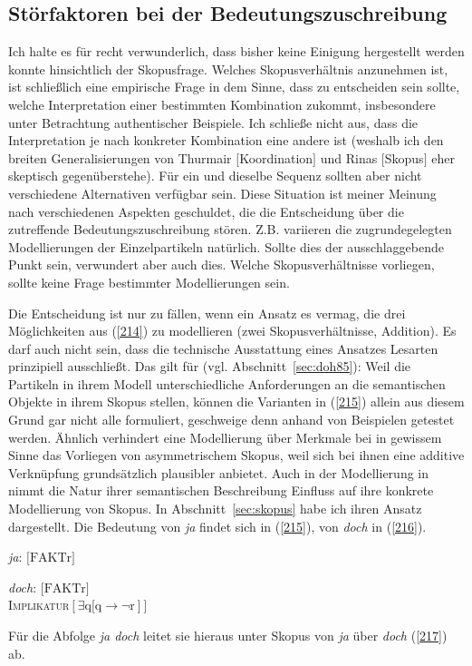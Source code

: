 \subsection{Störfaktoren bei der Bedeutungszuschreibung}
Ich halte es für recht verwunderlich, dass bisher keine Einigung hergestellt werden konnte hinsichtlich der Skopusfrage. Welches Skopusverhältnis anzunehmen ist, ist schließlich eine empirische Frage in dem Sinne, dass zu entscheiden sein sollte, welche Interpretation einer bestimmten Kombination zukommt, insbesondere unter Betrachtung authentischer Beispiele. Ich schließe nicht aus, dass die Interpretation je nach konkreter Kombination eine andere ist (weshalb ich den breiten Generalisierungen von Thurmair $[$Koordination$]$ und Rinas $[$Skopus$]$ eher skeptisch gegenüberstehe). Für ein und dieselbe Sequenz sollten aber nicht verschiedene Alternativen verfügbar sein. Diese Situation ist meiner Meinung nach verschiedenen Aspekten geschuldet, die die Entscheidung über die zu\-treffende Bedeutungszuschreibung stören. Z.B. variieren die zugrundegelegten Mo\-dellierungen der Einzelpartikeln natürlich. Sollte dies der ausschlaggebende Punkt sein, verwundert aber auch dies. Welche Skopusverhältnisse vorliegen, sollte keine Frage bestimmter Modellierungen sein. 

Die Entscheidung ist nur zu fällen, wenn ein Ansatz es vermag, die drei Möglich\-keiten aus (\ref{214}) zu modellieren (zwei Skopusverhältnisse, Addition). Es darf auch nicht sein, dass die technische Ausstattung eines Ansatzes Lesarten prinzipiell ausschließt. Das gilt für \citet{Doherty1985} (vgl. Abschnitt~\ref{sec:doh85}): Weil die Partikeln in ihrem Modell unterschiedliche Anforderungen an die semantischen Objekte in ihrem Skopus stellen, können die Varianten in (\ref{215}) allein aus diesem Grund gar nicht alle formuliert, geschweige denn anhand von Beispielen getestet werden. Ähnlich verhindert eine Modellierung über Merkmale bei \citet{Thurmair1989, Thurmair1991} in gewissem Sinne das Vorliegen von asymmetrischem Skopus, weil sich bei ihnen eine additive Verknüpfung grundsätzlich plausibler anbietet. Auch in der Modellierung in \citet{Ormelius-Sandblom1997} nimmt die Natur ihrer semantischen Beschreibung Einfluss auf ihre konkrete Modellierung von Skopus. In Abschnitt~\ref{sec:skopus} habe ich ihren Ansatz dargestellt. Die Bedeutung von \textit{ja} findet sich in (\ref{215}), von \textit{doch} in (\ref{216}).

\begin{exe} 
	\ex\label{215} 
			\textit{ja}: $\textrm{[FAKTr]}$
\end{exe}
\vspace{-0.65cm}
\begin{exe}
	\ex\label{216} 
		\textit{doch}: $\textrm{[FAKTr}]$\\
		\textsc{Implikatur}$[\exists \textrm{q[q} \rightarrow \neg \textrm{r}]]$
\end{exe}
Für die Abfolge \textit{ja doch} leitet sie hieraus unter Skopus von \textit{ja} über \textit{doch} (\ref{217}) ab.

